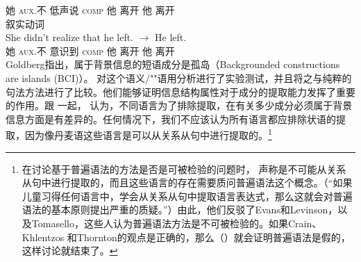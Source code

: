 她 \textsc{aux}.不 低声说 \textsc{comp} 他 离开 {} 他 离开\\
\ex 叙实动词\\
\gll She didn't realize that he left. $\to$ He left.\\
她 \textsc{aux}.不 意识到 \textsc{comp} 他 离开 {} 他 离开\\
\zl
Goldberg指出，属于背景信息的短语成分是孤岛（Backgrounded constructions are islands (BCI)）。 \citet{AG2008a}对这个语义/""语用分析进行了实验测试，并且将之与纯粹的句法方法进行了比较。他们能够证明信息结构属性对于成分的提取能力发挥了重要的作用。跟 \citet[\S~3.H]{Erteschik73a-u}一起， \citet[]{AG2008a}认为，不同语言为了排除提取，在有关多少成分必须属于背景信息方面是有差异的。任何情况下，我们不应该认为所有语言都应排除状语的提取，因为像丹麦语这些语言是可以从关系从句中进行提取的。\footnote{%
在讨论基于普遍语法的方法是否是可被检验的问题时， \citet*[]{CKT2010a}声称是不可能从关系从句中进行提取的，而且这些语言的存在需要质问普遍语法这个概念。（“如果儿童习得任何语言中，学会从关系从句中提取语言表达式，那么这就会对普遍语法的基本原则提出严重的质疑。”）由此，他们反驳了Evans和Levinson，以及Tomasello，这些人认为普遍语法方法是不可被检验的。如果Crain、Khlentzos 和Thornton的观点是正确的，那么（）就会证明普遍语法是假的，这样讨论就结束了。
}
